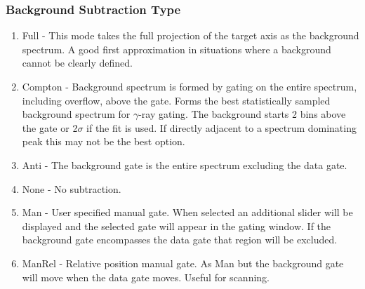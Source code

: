 \documentclass[a4paper,10pt]{article}
\begin{document}
\begin{enumerate}
\centering{}

\end{enumerate}

\subsubsection{Background Subtraction Type}
\begin{enumerate}
\item Full - This mode takes the full projection of the target axis as the background spectrum. A good first approximation in situations where a background cannot be clearly defined.
\item Compton - Background spectrum is formed by gating on the entire spectrum, including overflow, above the gate. Forms the best statistically sampled background spectrum for $\gamma$-ray gating. The background starts 2 bins above the gate or 2$\sigma$ if the fit is used. If directly adjacent to a spectrum dominating peak this may not be the best option. 
\item Anti - The background gate is the entire spectrum excluding the data gate.
\item None - No subtraction.
\item Man - User specified manual gate. When selected an additional slider will be displayed and the selected gate will appear in the gating window. If the background gate encompasses the data gate that region will be excluded.
\item ManRel - Relative position manual gate. As Man but the background gate will move when the data gate moves. Useful for scanning.
\end{enumerate}
\end{document}
